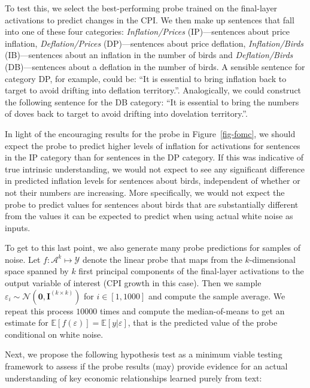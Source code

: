 \documentclass{article}
\theoremstyle{plain}
\theoremstyle{definition}
\theoremstyle{remark}
\begin{document}
To test this, we select the best-performing probe trained on the final-layer activations to predict changes in the CPI. We then make up sentences that fall into one of these four categories: \emph{Inflation/Prices} (IP)---sentences about price inflation, \emph{Deflation/Prices} (DP)---sentences about price deflation, \emph{Inflation/Birds} (IB)---sentences about an inflation in the number of birds and \emph{Deflation/Birds} (DB)---sentences about a deflation in the number of birds. A sensible sentence for category DP, for example, could be: ``It is essential to bring inflation back to target to avoid drifting into deflation territory.''. Analogically, we could construct the following sentence for the DB category: ``It is essential to bring the numbers of doves back to target to avoid drifting into dovelation territory.''.

In light of the encouraging results for the probe in
Figure~\ref{fig-fomc}, we should expect the probe to predict higher
levels of inflation for activations for sentences in the IP category
than for sentences in the DP category. If this was indicative of true
intrinsic understanding, we would not expect to see any significant
difference in predicted inflation levels for sentences about birds,
independent of whether or not their numbers are increasing. More
specifically, we would not expect the probe to predict values for
sentences about birds that are substantially different from the values
it can be expected to predict when using actual white noise as inputs.

To get to this last point, we also generate many probe predictions for
samples of noise. Let \(f: \mathcal{A}^k \mapsto \mathcal{Y}\) denote
the linear probe that maps from the \(k\)-dimensional space spanned by
\(k\) first principal components of the final-layer activations to the
output variable of interest (CPI growth in this case). Then we sample
\(\varepsilon_i \sim \mathcal{N}(\mathbf{0},\mathbf{I}^{(k \times k)})\)
for \(i \in [1,1000]\) and compute the sample average. We repeat this
process \(10000\) times and compute the median-of-means to get an
estimate for \(\mathbb{E}[f(\varepsilon)]=\mathbb{E}[y|\varepsilon]\),
that is the predicted value of the probe conditional on white noise.

Next, we propose the following hypothesis test as a minimum viable
testing framework to assess if the probe results (may) provide evidence
for an actual understanding of key economic relationships learned purely
from text:
\end{document}
